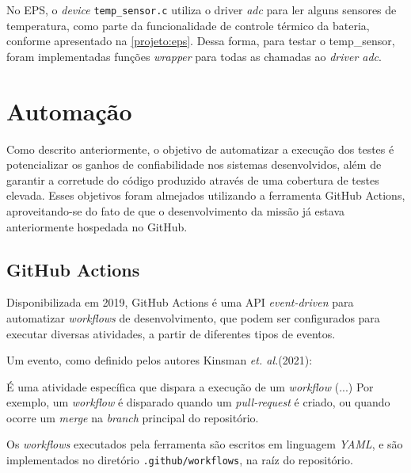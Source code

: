                 No EPS, o \textit{device} \texttt{temp\_sensor.c} utiliza o driver \textit{adc} para ler alguns sensores de temperatura, como parte da funcionalidade de controle térmico da bateria, conforme apresentado na \autoref{projeto:eps}. Dessa forma, para testar o temp\_sensor, foram implementadas funções \textit{wrapper} para todas as chamadas ao \textit{driver adc}.
                
                
                

    \section{Automação}
    \label{projeto:automacao}
        Como descrito anteriormente, o objetivo de automatizar a execução dos testes é potencializar os ganhos de confiabilidade nos sistemas desenvolvidos, além de garantir a corretude do código produzido através de uma cobertura de testes elevada. Esses objetivos foram almejados utilizando a ferramenta GitHub Actions, aproveitando-se do fato de que o desenvolvimento da missão já estava anteriormente hospedada no GitHub.
        
        \subsection{GitHub Actions}
            \label{projeto:gh-actions}
            Disponibilizada em 2019, GitHub Actions é uma API \textit{event-driven} para automatizar \textit{workflows} de desenvolvimento, que podem ser configurados para executar diversas atividades, a partir de diferentes tipos de eventos.
            
            Um evento, como definido pelos autores Kinsman \textit{et. al.}(2021): 
            \begin{citacao}
                \hspace{1,2cm} É uma atividade específica que dispara a execução de um \textit{workflow} (...) Por exemplo, um \textit{workflow} é disparado quando um \textit{pull-request} é criado, ou quando ocorre um \textit{merge} na \textit{branch} principal do repositório. \cite{kinsman-2021}
            \end{citacao}
            
            Os \textit{workflows} executados pela ferramenta são escritos em linguagem \textit{YAML}, e são implementados no diretório \texttt{.github/workflows}, na raíz do repositório.
            
